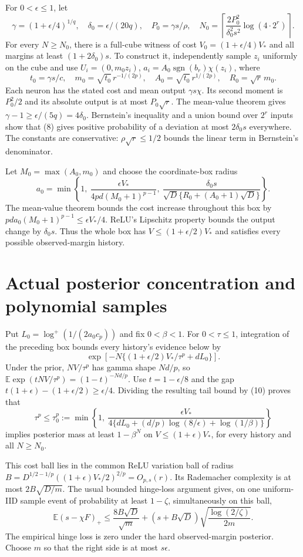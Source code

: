 \documentclass[11pt]{article}
\newcommand{\E}{\mathbb E}\newcommand{\R}{\mathbb R}
\begin{document}
For $0<\epsilon\le1$, let
\[
 \gamma=(1+\epsilon/4)^{1/q},\quad \delta_0=\epsilon/(20q),
 \quad P_0=\gamma s/\rho,
 \quad N_0=\left\lceil\frac{2P_0^2}{\delta_0^2s^2}
                                      \log(4\cdot2^r)\right\rceil.
 \tag{8}
\]
For every $N\ge N_0$, there is a full-cube witness of cost
$V_0=(1+\epsilon/4)V_*$ and all margins at least
$(1+2\delta_0)s$.
To construct it, independently sample $z_i$ uniformly on the cube and
use $U_i=(0,m_0z_i)$, $a_i=A_0\operatorname{sgn}(b_r)\chi(z_i)$,
where
\[
 t_0=\gamma s/c,\quad
 m_0=\sqrt{t_0}\,r^{-1/(2p)},\quad
 A_0=\sqrt{t_0}\,r^{1/(2p)},\quad R_0=\sqrt r\,m_0.
\]
Each neuron has the stated cost and mean output $\gamma s\chi$.
Its second moment is $P_0^2/2$ and its absolute output is at most
$P_0\sqrt r$. The mean-value theorem gives
$\gamma-1\ge\epsilon/(5q)=4\delta_0$.
Bernstein's inequality and a union bound over $2^r$ inputs show that
(8) gives positive probability of a deviation at most $2\delta_0s$
everywhere. The constants are conservative: $\rho\sqrt r\le1/2$
bounds the linear term in Bernstein's denominator.

Let $M_0=\max(A_0,m_0)$ and choose the coordinate-box radius
\[
 a_0=\min\left\{1,\
 \frac{\epsilon V_*}{4pd(M_0+1)^{p-1}},\
 \frac{\delta_0s}{\sqrt D\{R_0+(A_0+1)\sqrt D\}}\right\}.
 \tag{9}
\]
The mean-value theorem bounds the cost increase throughout this box
by $pd a_0(M_0+1)^{p-1}\le\epsilon V_*/4$.
ReLU's Lipschitz property bounds the output change by $\delta_0s$.
Thus the whole box has $V\le(1+\epsilon/2)V_*$ and satisfies every
possible observed-margin history.

\section{Actual posterior concentration and polynomial samples}
Put $L_0=\log^+(1/(2a_0c_p))$ and fix $0<\beta<1$.
For $0<\tau\le1$, integration of the preceding box bounds every
history's evidence below by
\[
 \exp\left[-N\{(1+\epsilon/2)V_*/\tau^p+dL_0\}\right].
 \tag{10}
\]
Under the prior, $NV/\tau^p$ has gamma shape $Nd/p$, so
$\E\exp(tNV/\tau^p)=(1-t)^{-Nd/p}$.
Use $t=1-\epsilon/8$ and the gap
$t(1+\epsilon)-(1+\epsilon/2)\ge\epsilon/4$.
Dividing the resulting tail bound by (10) proves that
\[
 \tau^p\le\tau_0^p:=
 \min\left\{1,\
 \frac{\epsilon V_*}
 {4\{dL_0+(d/p)\log(8/\epsilon)+\log(1/\beta)\}}\right\}
 \tag{11}
\]
implies posterior mass at least $1-\beta^N$ on
$V\le(1+\epsilon)V_*$, for every history and all $N\ge N_0$.

This cost ball lies in the common ReLU variation ball of radius
$B=D^{1/2-1/p}((1+\epsilon)V_*/2)^{2/p}=O_{p,s}(r)$.
Its Rademacher complexity is at most $2B\sqrt{D/m}$.
The usual bounded hinge-loss argument gives, on one uniform-IID sample
event of probability at least $1-\zeta$, simultaneously on this ball,
\[
 \E(s-\chi F)_+\le\frac{8B\sqrt D}{\sqrt m}
                +(s+B\sqrt D)\sqrt{\frac{\log(2/\zeta)}{2m}}.
 \tag{12}
\]
The empirical hinge loss is zero under the hard observed-margin
posterior. Choose $m$ so that the right side is at most $s\epsilon$.
\end{document}
